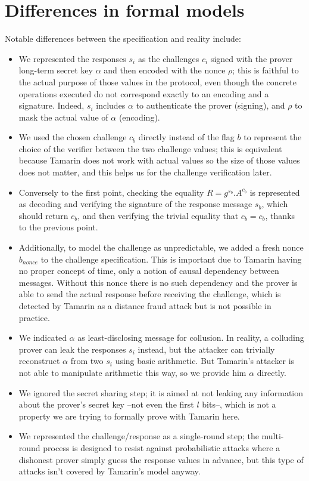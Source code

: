 \section{Differences in formal models}%
\label{formal-verif-appendix}

Notable differences between the specification and reality include:
\begin{itemize}
	\item We represented the responses $s_i$ as the challenges $c_i$ signed with the prover long-term secret key $\alpha$ and then encoded with the nonce $\rho$; this is faithful to the actual purpose of those values in the protocol, even though the concrete operations executed do not correspond exactly to an encoding and a signature. Indeed, $s_i$ includes $\alpha$ to authenticate the prover (signing), and $\rho$ to mask the actual value of $\alpha$ (encoding).
	\item We used the chosen challenge $c_b$ directly instead of the flag $b$ to represent the choice of the verifier between the two challenge values; this is equivalent because Tamarin does not work with actual values so the size of those values does not matter, and this helps us for the challenge verification later.
	\item Conversely to the first point, checking the equality $R = g^{s_b}.A^{c_b}$ is represented as decoding and verifying the signature of the response message $s_b$, which should return $c_b$, and then verifying the trivial equality that $c_b = c_b$, thanks to the previous point.
	\item Additionally, to model the challenge as unpredictable, we added a fresh nonce $b_{nonce}$ to the challenge specification. This is important due to Tamarin having no proper concept of time, only a notion of causal dependency between messages. Without this nonce there is no such dependency and the prover is able to send the actual response before receiving the challenge, which is detected by Tamarin as a distance fraud attack but is not possible in practice.
	\item We indicated $\alpha$ as least-disclosing message for collusion. In reality, a colluding prover can leak the responses $s_i$ instead, but the attacker can trivially reconstruct $\alpha$ from two $s_i$ using basic arithmetic. But Tamarin's attacker is not able to manipulate arithmetic this way, so we provide him $\alpha$ directly.
	\item We ignored the secret sharing step; it is aimed at not leaking any information about the prover's secret key --not even the first $l$ bits--, which is not a property we are trying to formally prove with Tamarin here. 
	\item We represented the challenge/response as a single-round step; the multi-round process is designed to resist against probabilistic attacks where a dishonest prover simply guess the response values in advance, but this type of attacks isn't covered by Tamarin's model anyway.
\end{itemize}



